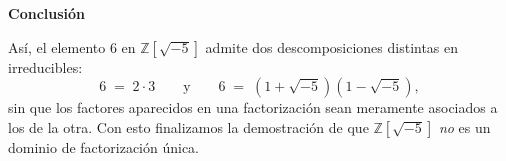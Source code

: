 \bigskip

\noindent
\textbf{Conclusión}

\noindent
Así, el elemento \(6\) en \(\mathbb{Z}[\sqrt{-5}]\) admite dos descomposiciones distintas en irreducibles:  
\[
6 \;=\; 2 \cdot 3 
\quad\quad\text{y}\quad\quad 
6 \;=\; (1 + \sqrt{-5})(1 - \sqrt{-5}),
\]
sin que los factores aparecidos en una factorización sean meramente asociados a los de la otra. Con esto finalizamos la demostración de que \(\mathbb{Z}[\sqrt{-5}]\) \emph{no} es un dominio de factorización única.
